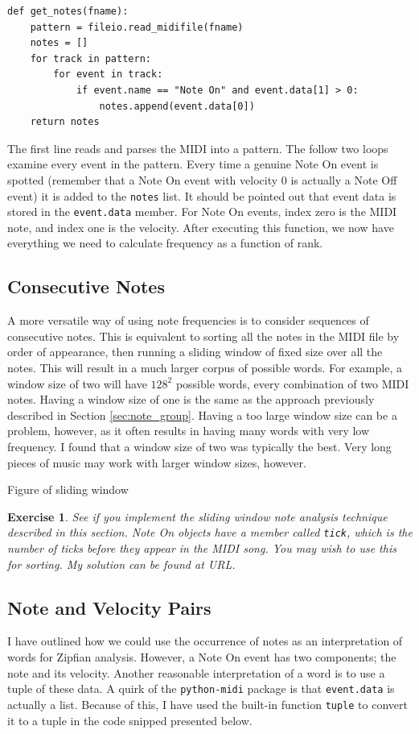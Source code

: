 \documentclass[10pt]{book}
\newtheorem{exercise}{Exercise}[chapter]
\begin{document}
\begin{verbatim}
def get_notes(fname):
    pattern = fileio.read_midifile(fname)
    notes = []
    for track in pattern:
        for event in track:
            if event.name == "Note On" and event.data[1] > 0:
                notes.append(event.data[0])
    return notes
\end{verbatim}

The first line reads and parses the MIDI into a pattern. The follow two loops examine every event in the pattern. Every time a genuine Note On event is spotted (remember that a Note On event with velocity 0 is actually a Note Off event) it is added to the \texttt{notes} list. It should be pointed out that event data is stored in the \texttt{event.data} member. For Note On events, index zero is the MIDI note, and index one is the velocity. After executing this function, we now have everything we need to calculate frequency as a function of rank.


\subsection{Consecutive Notes}
A more versatile way of using note frequencies is to consider sequences of consecutive notes. This is equivalent to sorting all the notes in the MIDI file by order of appearance, then running a sliding window of fixed size over all the notes. This will result in a much larger corpus of possible words. For example, a window size of two will have $128^2$ possible words, every combination of two MIDI notes. Having a window size of one is the same as the approach previously described in Section \ref{sec:note_group}. Having a too large window size can be a problem, however, as it often results in having many words with very low frequency. I found that a window size of two was typically the best. Very long pieces of music may work with larger window sizes, however.

Figure of sliding window

\begin{exercise}
See if you implement the sliding window note analysis technique described in this section. Note On objects have a member called \texttt{tick}, which is the number of ticks before they appear in the MIDI song. You may wish to use this for sorting. My solution can be found at URL.
\end{exercise}


\subsection{Note and Velocity Pairs}
I have outlined how we could use the occurrence of notes as an interpretation of words for Zipfian analysis. However, a Note On event has two components; the note and its velocity. Another reasonable interpretation of a word is to use a tuple of these data. A quirk of the \texttt{python-midi} package is that \texttt{event.data} is actually a list. Because of this, I have used the built-in function \texttt{tuple} to convert it to a tuple in the code snipped presented below.
\end{document}
